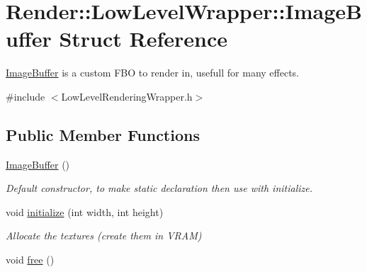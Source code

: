 \hypertarget{struct_render_1_1_low_level_wrapper_1_1_image_buffer}{}\section{Render\+:\+:Low\+Level\+Wrapper\+:\+:Image\+Buffer Struct Reference}
\label{struct_render_1_1_low_level_wrapper_1_1_image_buffer}


\hyperlink{struct_render_1_1_low_level_wrapper_1_1_image_buffer}{Image\+Buffer} is a custom F\+BO to render in, usefull for many effects.  




{\ttfamily \#include $<$Low\+Level\+Rendering\+Wrapper.\+h$>$}

\subsection*{Public Member Functions}
\begin{DoxyCompactItemize}
\item 
\hyperlink{struct_render_1_1_low_level_wrapper_1_1_image_buffer_a4ec4732fee797a68980ee2246228965f}{Image\+Buffer} ()
\begin{DoxyCompactList}\small\item\em Default constructor, to make static declaration then use with initialize. \end{DoxyCompactList}\item 
void \hyperlink{struct_render_1_1_low_level_wrapper_1_1_image_buffer_a5b27e51c4ab797a1835be059c4f89a09}{initialize} (int width, int height)
\begin{DoxyCompactList}\small\item\em Allocate the textures (create them in V\+R\+AM) \end{DoxyCompactList}\item 
void \hyperlink{struct_render_1_1_low_level_wrapper_1_1_image_buffer_a97e967ed4dd863d8c7ebd2f1dc6241e8}{free} ()
\end{DoxyCompactItemize}
